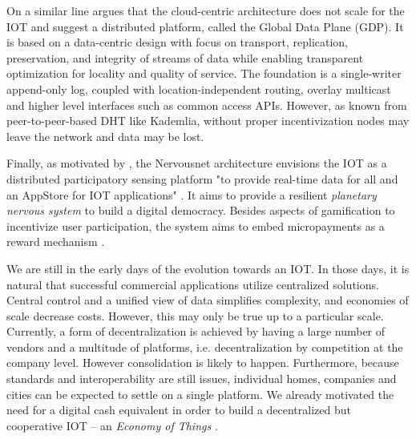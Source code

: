 On a similar line \cite{Zhang:2015} argues that the cloud-centric architecture does not scale for the \ac{IOT} and suggest a distributed platform, called the Global Data Plane (GDP). It is based on a data-centric design with focus on transport, replication, preservation, and integrity of streams of data while enabling transparent optimization for locality and quality of service. The foundation is a single-writer append-only log, coupled with location-independent routing, overlay multicast and higher level interfaces such as common access \ac{API}s. However, as known from peer-to-peer-based \ac{DHT} like Kademlia, without proper incentivization nodes may leave the network and data may be lost.

Finally, as motivated by \cite{Giannotti2012}, the Nervousnet architecture envisions the \ac{IOT} as a distributed participatory sensing platform "to provide real-time data for all and an AppStore for \ac{IOT} applications" \parencite{7097988}. It aims to provide a resilient \emph{planetary nervous system} to build a digital democracy. Besides aspects of gamification to incentivize user participation, the system aims to embed micropayments as a reward mechanism \parencite{Helbing2015Nature}.

We are still in the early days of the evolution towards an \ac{IOT}. In those days, it is natural that successful commercial applications utilize centralized solutions. Central control and a unified view of data simplifies complexity, and economies of scale decrease costs. However, this may only be true up to a particular scale. Currently, a form of decentralization is achieved by having a large number of vendors and a multitude of platforms, i.e. decentralization by competition at the company level. However consolidation is likely to happen. Furthermore, because standards and interoperability are still issues, individual homes, companies and cities can be expected to settle on a single platform.
We already motivated the need for a digital cash equivalent in order to build a decentralized but cooperative \ac{IOT} -- an \emph{Economy of Things} \parencite{Pureswaran2015}.







